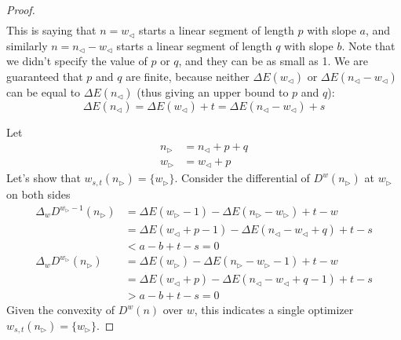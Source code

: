 \documentclass[]{article}
\begin{document}
\begin{proof}
\begin{align*}
	\end{align*}
	This is saying that $n = w_{\triangleleft}$ starts a linear segment of length $p$ with slope $a$, and similarly $n = n_{\triangleleft} - w_{\triangleleft}$ starts a linear segment of length $q$ with slope $b$. Note that we didn't specify the value of $p$ or $q$, and they can be as small as 1. We are guaranteed that $p$ and $q$ are finite, because neither  $\Delta E(w_{\triangleleft})$ or $\Delta E(n_{\triangleleft} - w_{\triangleleft})$ can be equal to $\Delta E(n_{\triangleleft})$ (thus giving an upper bound to $p$ and $q$):
	\[
	\Delta E(n_{\triangleleft}) = \Delta E(w_{\triangleleft}) + t = \Delta E(n_{\triangleleft} - w_{\triangleleft}) + s
	\]

	Let
	\begin{align*}
	n_{\triangleright} &= n_{\triangleleft} + p + q\\
	w_{\triangleright} &= w_{\triangleleft} + p
	\end{align*}
	Let's show that $w_{s,t}(n_{\triangleright}) = \{w_{\triangleright}\}$. Consider the differential of $D^w(n_{\triangleright})$ at $w_{\triangleright}$ on both sides
	\begin{align*}
	\Delta_w D^{w_{\triangleright} - 1}(n_{\triangleright}) &= \Delta E(w_{\triangleright} - 1) - \Delta E(n_{\triangleright} - w_{\triangleright}) +t - w \\
	&=\Delta E(w_{\triangleleft} + p - 1) - \Delta E(n_{\triangleleft} - w_{\triangleleft} + q) +t - s\\
	&<a - b + t - s = 0\\
	\Delta_w D^{w_{\triangleright}}(n_{\triangleright}) &= \Delta E(w_{\triangleright}) - \Delta E(n_{\triangleright} - w_{\triangleright} - 1) +t - w \\
	&=\Delta E(w_{\triangleleft} + p) - \Delta E(n_{\triangleleft} - w_{\triangleleft} + q - 1) +t - s\\
	& > a - b + t - s =0
	\end{align*}
	Given the convexity of $D^w(n)$ over $w$, this indicates a single optimizer $w_{s,t}(n_{\triangleright}) = \{w_{\triangleright}\}$.


\end{proof}
\end{document}
